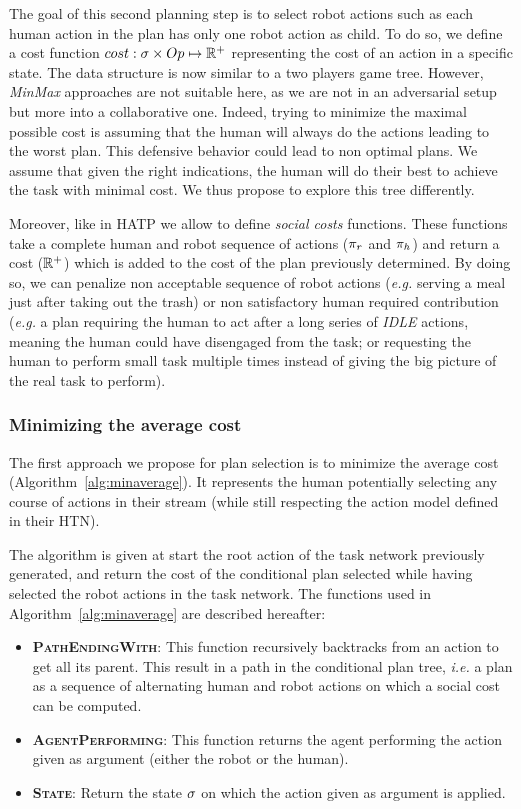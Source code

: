 \documentclass[a4paper,11pt,twoside]{StyleThese}
\begin{document}
The goal of this second planning step is to select robot actions such as each human action in the plan has only one robot action as child.
To do so, we define a cost function $cost: \sigma \times Op \mapsto \mathbb{R}^+$ representing the cost of an action in a specific state. The data structure is now similar to a two players game tree. However, \textit{MinMax} approaches are not suitable here, as we are not in an adversarial setup but more into a collaborative one. Indeed, trying to minimize the maximal possible cost is assuming that the human will always do the actions leading to the worst plan. This defensive behavior could lead to non optimal plans. We assume that given the right indications, the human will do their best to achieve the task with minimal cost. We thus propose to explore this tree differently.

Moreover, like in HATP we allow to define \textit{social costs} functions. These functions take a complete human and robot sequence of actions ($\pi_r$ and $\pi_h$) and return a cost ($\mathbb{R}^+$) which is added to the cost of the plan previously determined. By doing so, we can penalize non acceptable sequence of robot actions (\textit{e.g.} serving a meal just after taking out the trash) or non satisfactory human required contribution (\textit{e.g.} a plan requiring the human to act after a long series of \textit{IDLE} actions, meaning the human could have disengaged from the task; or requesting the human to perform small task multiple times instead of giving the big picture of the real task to perform).

\subsubsection{Minimizing the average cost}
The first approach we propose for plan selection is to minimize the average cost (Algorithm~\ref{alg:minaverage}). It represents the human potentially selecting any course of actions in their stream (while still respecting the action model defined in their HTN).

The algorithm is given at start the root action of the task network previously generated, and return the cost of the conditional plan selected while having selected the robot actions in the task network. The functions used in Algorithm~\ref{alg:minaverage} are described hereafter:

\begin{itemize}
\item \textbf{\textsc{PathEndingWith}}: This function recursively backtracks from an action to get all its parent. This result in a path in the conditional plan tree, \textit{i.e.} a plan as a sequence of alternating human and robot actions on which a social cost can be computed.

\item \textbf{\textsc{AgentPerforming}}: This function returns the agent performing the action given as argument (either the robot or the human).

\item \textbf{\textsc{State}}: Return the state $\sigma$ on which the action given as argument is applied.
\end{itemize}
\end{document}
